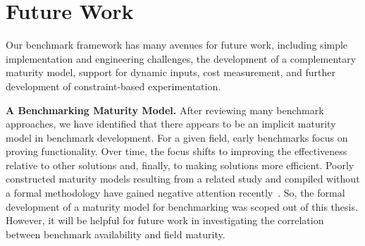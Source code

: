 \section{Future Work}
\label{section:61-Future-Work}

Our \gai benchmark framework has many avenues for future work, including simple implementation and engineering challenges, the development of a complementary maturity model, support for dynamic inputs, cost measurement, and further development of constraint-based experimentation.



\textbf{A Benchmarking Maturity Model.}
After reviewing many benchmark approaches, we have identified that there appears to be an implicit maturity model in benchmark development. 
For a given field, early benchmarks focus on proving functionality.
Over time, the focus shifts to improving the effectiveness relative to other solutions and, finally, to making solutions more efficient. 
Poorly constructed maturity models resulting from a related study and compiled without a formal methodology have gained negative attention recently~\cite{Lahrmann2011, Sadiq2021}. 
So, the formal development of a maturity model for benchmarking was scoped out of this thesis.
However, it will be helpful for future work in investigating the correlation between benchmark availability and field maturity. 


